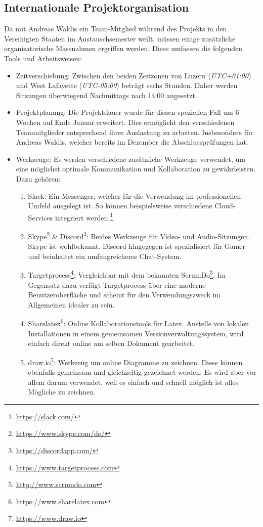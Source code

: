 \subsection{Internationale Projektorganisation}
\label{subsec:international}
Da mit Andreas Waldis ein Team-Mitglied während des Projekts in den Vereinigten Staaten im Austauschsemester weilt, müssen einige zusätzliche organisatorische Massnahmen ergriffen werden. Diese umfassen die folgenden Tools und Arbeitsweisen:
\begin{itemize}
\item Zeitverschiebung: Zwischen den beiden Zeitzonen von Luzern (\textit{UTC+01:00}) und West Lafayette (\textit{UTC-05:00}) beträgt sechs Stunden. Daher werden Sitzungen überwiegend Nachmittags nach 14:00 angesetzt. 
\item Projektplanung: Die Projektdauer wurde für diesen speziellen Fall um 6 Wochen auf Ende Januar erweitert. Dies ermöglicht den verschiedenen Teammitglieder entsprechend ihrer Auslastung zu arbeiten. Insbesondere für Andreas Waldis, welcher bereits im Dezember die Abschlussprüfungen hat. 
\item Werkzeuge: Es werden verschiedene zusätzliche Werkzeuge verwendet, um eine möglichst optimale Kommunikation und Kollaboration zu gewährleisten. Dazu gehören:
\begin{enumerate}
\item Slack: Ein Messenger, welcher für die Verwendung im professionellen Umfeld ausgelegt ist. So können beispielsweise verschiedene Cloud-Services integriert werden.\footnote{\url{https://slack.com/}}
\item Skype\footnote{\url{https://www.skype.com/de/}} \& Discord\footnote{\url{https://discordapp.com/}}: Beides Werkzeuge für Video- und Audio-Sitzungen. Skype ist wohlbekannt. Discord hingegegen ist spezialisiert für Gamer und beinhaltet ein umfangreicheres Chat-System.
\item Targetprocess\footnote{\url{https://www.targetprocess.com}}: Vergleichbar mit dem bekannten ScrumDo\footnote{\url{http://www.scrumdo.com}}. Im Gegensatz dazu verfügt Targetprocess über eine moderne Benutzeroberfläche und scheint für den Verwendungszweck im Allgemeinen idealer zu sein.
\item Sharelatex\footnote{\url{https://www.sharelatex.com}}: Online Kollaborationstools für Latex. Anstelle von lokalen Installationen in einem gemeinsamen Versionverwaltungssystem, wird einfach direkt online am selben Dokument gearbeitet.
\item draw.io\footnote{\url{https://www.draw.io}}: Werkzeug um online Diagramme zu zeichnen. Diese können ebenfalls gemeinsam und gleichzeitig gezeichnet werden. Es wird aber vor allem darum verwendet, weil es einfach und schnell möglich ist alles Mögliche zu zeichnen.
\end{enumerate}
\end{itemize}

